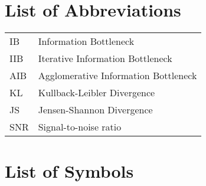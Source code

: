 
\section*{List of Abbreviations}
%

\begin{longtable}[l]{p{3cm} l}
IB & Information Bottleneck\\
IIB & Iterative Information Bottleneck\\
AIB & Agglomerative Information Bottleneck\\
KL & Kullback-Leibler Divergence\\
JS & Jensen-Shannon Divergence\\
SNR & Signal-to-noise ratio\\
\end{longtable}
\section*{List of Symbols}
		
\renewcommand{\dotfill}{\leaders\hbox to 5pt{\hss.\hss}\hfill}



